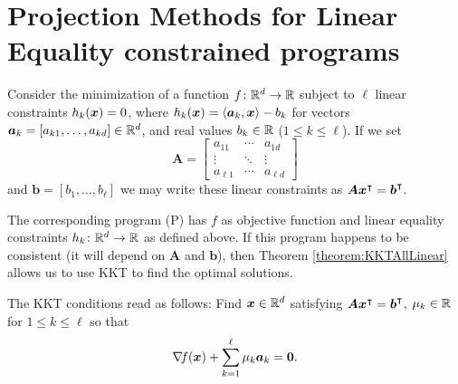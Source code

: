 
\section[Projection Methods]{Projection Methods for Linear Equality constrained programs}

Consider the minimization of a function $f\colon \mathbb{R}^d \to \mathbb{R}$ subject to $\ell$ linear constraints $h_k(\boldsymbol{x}) = 0$, where $h_k(\boldsymbol{x}) = \langle \boldsymbol{a}_k , \boldsymbol{x} \rangle - b_k$ for vectors $\boldsymbol{a}_k=[a_{k1}, \dotsc, a_{kd}] \in \mathbb{R}^d$, and real values $b_k \in \mathbb{R}$ ($1\leq k \leq \ell$).  If we set 
\begin{equation*}
\boldsymbol{A} = \begin{bmatrix} a_{11} & \dotsb & a_{1d} \\ \vdots & \ddots & \vdots \\ a_{\ell 1} & \dotsb & a_{\ell d} \end{bmatrix}
\end{equation*}
and $\boldsymbol{b} = [b_1, \dotsc, b_\ell]$ we may write these linear constraints as $\boldsymbol{A}{\boldsymbol{x}}^\intercal={\boldsymbol{b}}^\intercal$.

The corresponding program (P) has $f$ as objective function and linear equality constraints $h_k\colon \mathbb{R}^d \to \mathbb{R}$ as defined above.  If this program happens to be consistent (it will depend on $\boldsymbol{A}$ and $\boldsymbol{b}$), then Theorem \ref{theorem:KKTAllLinear} allows us to use KKT to find the optimal solutions. 

The KKT conditions read as follows: Find $\boldsymbol{x} \in \mathbb{R}^d$ satisfying $\boldsymbol{A}{\boldsymbol{x}}^\intercal = {\boldsymbol{b}}^\intercal$, $\mu_k \in \mathbb{R}$ for $1 \leq k \leq \ell$ so that
\begin{equation}\label{equation:KKTforLECP}
\mathop{\nabla\! {f}}(\boldsymbol{x}) + \sum_{k=1}^\ell \mu_k \boldsymbol{a}_k = \boldsymbol{0}.
\end{equation}


